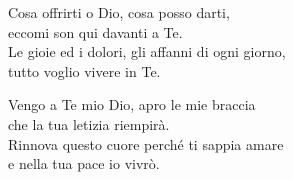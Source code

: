 
\strofa Cosa offrirti o Dio, cosa posso darti,\\
eccomi son qui davanti a Te.\\
Le gioie ed i dolori, gli affanni di ogni giorno,\\
tutto voglio vivere in Te.

\spazio


\spazio

\strofa Vengo a Te mio Dio, apro le mie braccia\\
che la tua letizia riempirà.\\
Rinnova questo cuore perché ti sappia amare\\
e nella tua pace io vivrò.

\spazio

 